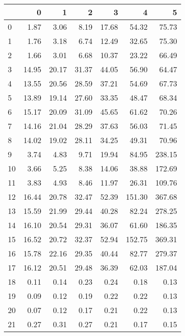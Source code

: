 \begin{tabular}{lrrrrrr}
\toprule
{} &       0 &       1 &       2 &        3 &        4 &         5 \\
\midrule
0  &    1.87 &    3.06 &    8.19 &    17.68 &    54.32 &     75.73 \\
1  &    1.76 &    3.18 &    6.74 &    12.49 &    32.65 &     75.30 \\
2  &    1.66 &    3.01 &    6.68 &    10.37 &    23.22 &     66.49 \\
3  &   14.95 &   20.17 &   31.37 &    44.05 &    56.90 &     64.47 \\
4  &   13.55 &   20.56 &   28.59 &    37.21 &    54.69 &     67.73 \\
5  &   13.89 &   19.14 &   27.60 &    33.35 &    48.47 &     68.34 \\
6  &   15.17 &   20.09 &   31.09 &    45.65 &    61.62 &     70.26 \\
7  &   14.16 &   21.04 &   28.29 &    37.63 &    56.03 &     71.45 \\
8  &   14.02 &   19.02 &   28.11 &    34.25 &    49.31 &     70.96 \\
9  &    3.74 &    4.83 &    9.71 &    19.94 &    84.95 &    238.15 \\
10 &    3.66 &    5.25 &    8.38 &    14.06 &    38.88 &    172.69 \\
11 &    3.83 &    4.93 &    8.46 &    11.97 &    26.31 &    109.76 \\
12 &   16.44 &   20.78 &   32.47 &    52.39 &   151.30 &    367.68 \\
13 &   15.59 &   21.99 &   29.44 &    40.28 &    82.24 &    278.25 \\
14 &   16.10 &   20.54 &   29.31 &    36.07 &    61.60 &    186.35 \\
15 &   16.52 &   20.72 &   32.37 &    52.94 &   152.75 &    369.31 \\
16 &   15.78 &   22.16 &   29.35 &    40.44 &    82.77 &    279.37 \\
17 &   16.12 &   20.51 &   29.48 &    36.39 &    62.03 &    187.04 \\
18 &    0.11 &    0.14 &    0.23 &     0.24 &     0.18 &      0.13 \\
19 &    0.09 &    0.12 &    0.19 &     0.22 &     0.22 &      0.13 \\
20 &    0.07 &    0.12 &    0.17 &     0.21 &     0.22 &      0.13 \\
21 &    0.27 &    0.31 &    0.27 &     0.21 &     0.17 &      0.15 \\

\end{tabular}
